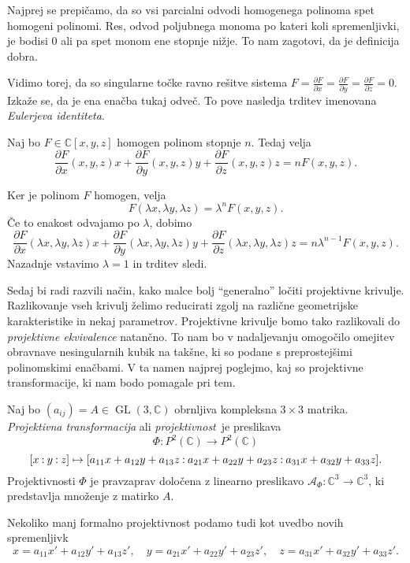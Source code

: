 \documentclass[mat1]{fmfdelo}
\newcommand{\C}{\mathbb C}
\newcommand{\PC}{P^2(\mathbb C)}
\newcommand{\Cxyz}{\C[x,y,z]}
\newcommand{\pcoor}[1]{%
  \begingroup\lccode`~=`: \lowercase{\endgroup
  \edef~}{\mathbin{\mathchar\the\mathcode`:}\nobreak}%
  [%
  \begingroup
  \mathcode`:=\string"8000
  #1%
  \endgroup
  ]%
}
\newcommand{\pdv}[2][]{\frac{\partial#1}{\partial#2}}
\DeclareMathOperator{\GL}{GL}
\theoremstyle{definition}
\begin{document}
Najprej se prepičamo, da so vsi parcialni odvodi homogenega polinoma spet homogeni polinomi. Res, odvod poljubnega monoma po kateri koli spremenljivki, je bodisi $0$ ali pa spet monom ene stopnje nižje. To nam zagotovi, da je definicija dobra.

Vidimo torej, da so singularne točke ravno rešitve sistema $F = \pdv[F]{x}= \pdv[F]{y} = \pdv[F]{z} = 0$.
Izkaže se, da je ena enačba tukaj odveč. To pove nasledja trditev imenovana \emph{Eulerjeva identiteta}.

\begin{trditev}
    Naj bo $F \in \Cxyz$ homogen polinom stopnje $n$. Tedaj velja
    \[
        \pdv[F]{x}(x,y,z)x + \pdv[F]{y}(x,y,z)y + \pdv[F]{z}(x,y,z)z = nF(x,y,z). 
    \]
\end{trditev}

\begin{dokaz}
    Ker je polinom $F$ homogen, velja 
    $$ F(\lambda x, \lambda y, \lambda z) = \lambda^n F(x,y,z).$$
    Če to enakost odvajamo po $\lambda$, dobimo
    $$ \pdv[F]{x}(\lambda x,\lambda y,\lambda z)x + 
    \pdv[F]{y}(\lambda x,\lambda y,\lambda z) y + 
    \pdv[F]{z}(\lambda x,\lambda y,\lambda z) z = n\lambda^{n-1}F(x,y,z).$$
    Nazadnje vstavimo $\lambda = 1$ in trditev sledi.
\end{dokaz}

Sedaj bi radi razvili način, kako malce bolj ``generalno'' ločiti projektivne krivulje. Razlikovanje vseh krivulj želimo reducirati zgolj na različne geometrijske karakteristike in nekaj parametrov. 
Projektivne krivulje bomo tako razlikovali do \emph{projektivne ekvivalence} natančno. 
To nam bo v nadaljevanju omogočilo omejitev obravnave nesingularnih kubik na takšne, ki so podane s preprostejšimi polinomskimi enačbami.
V ta namen najprej poglejmo, kaj so projektivne transformacije, ki nam bodo pomagale pri tem.

\begin{definicija}
    Naj bo $(a_{ij}) = A \in \GL(3, \C)$ obrnljiva kompleksna $3 \times 3$ matrika. \emph{Projektivna transformacija} ali \emph{projektivnost} je preslikava
        $$\Phi : \PC \to \PC$$
        $$\pcoor{x:y:z} \mapsto \pcoor{a_{11}x + a_{12}y + a_{13}z: a_{21}x + a_{22}y + a_{23}z: a_{31}x + a_{32}y + a_{33}z}.$$
    Projektivnosti $\Phi$ je pravzaprav določena z linearno preslikavo $\mathcal{A}_{\Phi} : \C^3 \to \C^3$, ki predstavlja množenje z matirko $A$.

    Nekoliko manj formalno projektivnost podamo tudi kot uvedbo novih spremenljivk 
    \[
        x = a_{11}x' + a_{12}y' + a_{13}z', \quad y = a_{21}x' + a_{22}y' + a_{23}z', \quad z = a_{31}x' + a_{32}y' + a_{33}z'.  
    \]
\end{definicija}
\end{document}
